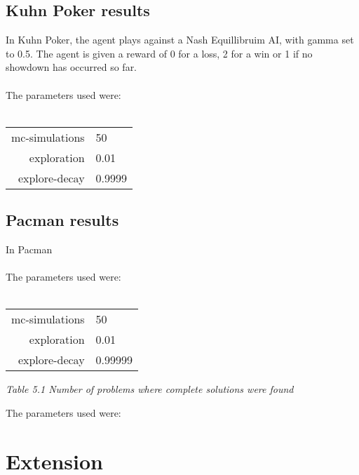 \documentclass[pdftex,twoside,a4paper]{report}
\begin{document}
\section{Kuhn Poker results}
In Kuhn Poker, the agent plays against a Nash Equillibruim AI, with gamma set to 0.5. The agent is given a reward of 0 for a loss, 2 for a win or 1 if no showdown has occurred so far.\\\\
The parameters used were:\\\\
\begin{tabular}{| r | l | }
\hline
mc-simulations & 50\\
exploration & 0.01\\
explore-decay & 0.9999\\
\hline
\end{tabular}
\section{Pacman results}
In Pacman\\\\
The parameters used were:\\\\
\begin{tabular}{| r | l | }
\hline
mc-simulations & 50\\
exploration & 0.01\\
explore-decay & 0.99999\\
\hline
\end{tabular}

 \begin{center}
\emph{Table 5.1 Number of problems where complete solutions were found}
\end{center}
The parameters used were:
\chapter{Extension}



\end{document}
